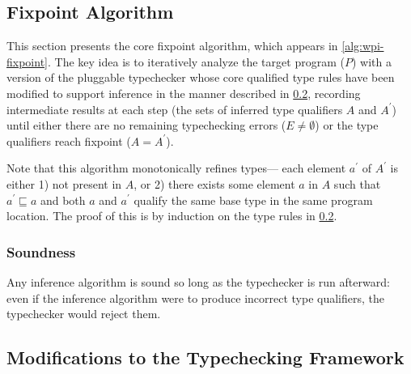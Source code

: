 

\subsection{Fixpoint Algorithm}
\label{sec:core-algorithm}



This section presents the core fixpoint algorithm, which appears
in \cref{alg:wpi-fixpoint}. The key idea is to iteratively analyze
the target program ($P$) with a version of the
pluggable typechecker whose core qualified type rules
have been modified to support inference in the manner described in
\cref{sec:instrument}, recording intermediate results at each
step (the sets of inferred type qualifiers $A$ and $A^{\prime}$) until
either there are no remaining typechecking errors
(\ie $E \neq \emptyset$)
or the
type qualifiers reach fixpoint (\ie $A = A^{\prime}$).


Note that this algorithm monotonically refines types---\ie
each element $a^{\prime}$ of $A^{\prime}$ is either 1) not present in $A$, or
2) there exists some element $a$ in $A$ such that $a^{\prime} \sqsubseteq a$
and both $a$ and $a^{\prime}$ qualify the same base type in the same program location.
The proof of this is by induction on the type rules in \cref{sec:instrument}.

\subsubsection{Soundness}
\label{sec:soundness}

Any inference algorithm is sound so long as the typechecker is run afterward:
even if the inference algorithm were to produce incorrect type qualifiers,
the typechecker would reject them.

\subsection{Modifications to the Typechecking Framework}
\label{sec:instrument}

